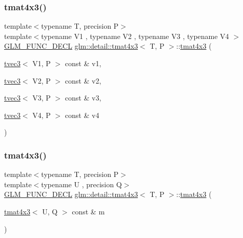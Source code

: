 \subsubsection{\texorpdfstring{tmat4x3()}{tmat4x3()}\hspace{0.1cm}{\footnotesize\ttfamily [9/22]}}
{\footnotesize\ttfamily template$<$typename T, precision P$>$ \\
template$<$typename V1 , typename V2 , typename V3 , typename V4 $>$ \\
\hyperlink{setup_8hpp_ab2d052de21a70539923e9bcbf6e83a51}{G\+L\+M\+\_\+\+F\+U\+N\+C\+\_\+\+D\+E\+CL} \hyperlink{structglm_1_1detail_1_1tmat4x3}{glm\+::detail\+::tmat4x3}$<$ T, P $>$\+::\hyperlink{structglm_1_1detail_1_1tmat4x3}{tmat4x3} (\begin{DoxyParamCaption}\item[{\hyperlink{structglm_1_1detail_1_1tvec3}{tvec3}$<$ V1, P $>$ const \&}]{v1,  }\item[{\hyperlink{structglm_1_1detail_1_1tvec3}{tvec3}$<$ V2, P $>$ const \&}]{v2,  }\item[{\hyperlink{structglm_1_1detail_1_1tvec3}{tvec3}$<$ V3, P $>$ const \&}]{v3,  }\item[{\hyperlink{structglm_1_1detail_1_1tvec3}{tvec3}$<$ V4, P $>$ const \&}]{v4 }\end{DoxyParamCaption})}

\mbox{\label{structglm_1_1detail_1_1tmat4x3_a1544dbd7a57f8c8d9ee9cbeb4e62bd3a}} 
\subsubsection{\texorpdfstring{tmat4x3()}{tmat4x3()}\hspace{0.1cm}{\footnotesize\ttfamily [10/22]}}
{\footnotesize\ttfamily template$<$typename T, precision P$>$ \\
template$<$typename U , precision Q$>$ \\
\hyperlink{setup_8hpp_ab2d052de21a70539923e9bcbf6e83a51}{G\+L\+M\+\_\+\+F\+U\+N\+C\+\_\+\+D\+E\+CL} \hyperlink{structglm_1_1detail_1_1tmat4x3}{glm\+::detail\+::tmat4x3}$<$ T, P $>$\+::\hyperlink{structglm_1_1detail_1_1tmat4x3}{tmat4x3} (\begin{DoxyParamCaption}\item[{\hyperlink{structglm_1_1detail_1_1tmat4x3}{tmat4x3}$<$ U, Q $>$ const \&}]{m }\end{DoxyParamCaption})\hspace{0.3cm}{\ttfamily [explicit]}}

